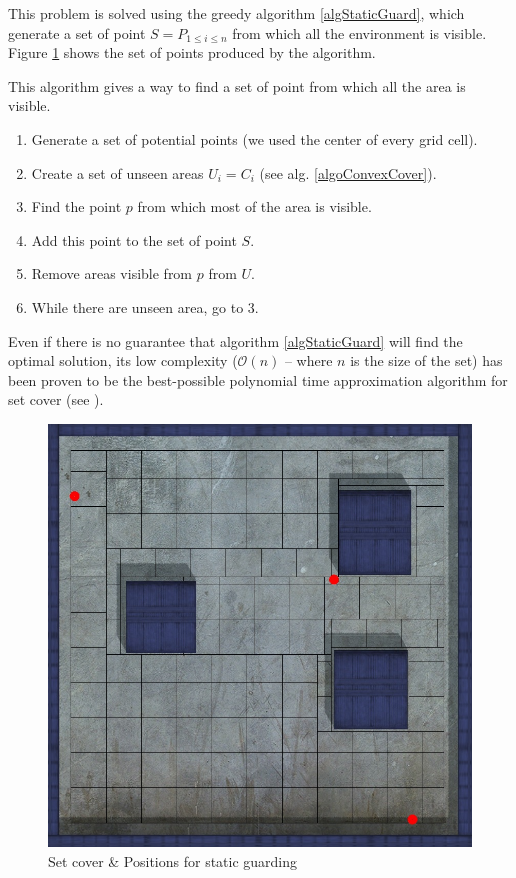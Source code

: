 This problem is solved using the greedy algorithm \ref{algStaticGuard}, which generate a set of point $ S = P_{1\leq i \leq n}$ from which all the environment is visible. Figure \ref{staticCoverSet} shows the set of points produced by the algorithm.

\begin{algorithm}
This algorithm gives a way to find a set of point from which all the area is visible.
\begin{enumerate}
	\item Generate a set of potential points (we used the center of every grid cell).
	\item Create a set of unseen areas $U_i = C_i$ (see alg. \ref{algoConvexCover}).
	\item Find the point $p$ from which most of the area is visible.
	\item Add this point to the set of point $S$.
	\item Remove areas visible from $p$ from $U$.
	\item While there are unseen area, go to 3.
\end{enumerate}
\label{algStaticGuard}
\end{algorithm}

Even if there is no guarantee that algorithm \ref{algStaticGuard} will find the optimal solution, its low complexity ($\mathcal{O}(n)$ -- where $n$ is the size of the set) has been proven to be the best-possible polynomial time approximation algorithm for set cover (see \cite{approxMinProb}).

\begin{figure}[h!t]
	\begin{center}
	\includegraphics[width=\linewidth,natwidth=824,natheight=823]{fig/staticCoverSet.jpg}
	\end{center}
	\caption{Set cover \& Positions for static guarding}
	\label{staticCoverSet}
\end{figure}